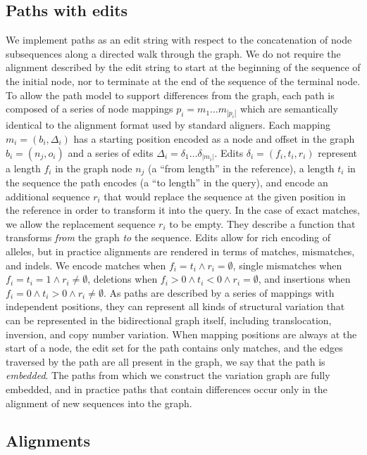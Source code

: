 \subsection{Paths with edits}

We implement paths as an edit string with respect to the concatenation of node subsequences along a directed walk through the graph.
We do not require the alignment described by the edit string to start at the beginning of the sequence of the initial node, nor to terminate at the end of the sequence of the terminal node.
To allow the path model to support differences from the graph, each path is composed of a series of node mappings $p_i = m_1 \ldots m_{|p_i|}$ which are semantically identical to the alignment format used by standard aligners.
Each mapping $m_i = ( b_i, \Delta_i )$ has a starting position encoded as a node and offset in the graph $b_i = ( n_j, o_i )$ and a series of edits $\Delta_i = \delta_1 \ldots \delta_{|m_i|}$.
Edits $\delta_i = ( f_i, t_i, r_i )$ represent a length $f_i$ in the graph node $n_j$ (a ``from length'' in the reference), a length $t_i$ in the sequence the path encodes (a ``to length'' in the query), and encode an additional sequence $r_i$ that would replace the sequence at the given position in the reference in order to transform it into the query.
In the case of exact matches, we allow the replacement sequence $r_i$ to be empty.
They describe a function that transforms \emph{from} the graph \emph{to} the sequence.
Edits allow for rich encoding of alleles, but in practice alignments are rendered in terms of matches, mismatches, and indels.
We encode matches when $f_i = t_i \land r_i = \emptyset$, single mismatches when $f_i = t_i = 1 \land r_i \neq \emptyset$, deletions when $f_i > 0 \land t_i < 0 \land r_i = \emptyset$, and insertions when $f_i = 0 \land t_i > 0 \land r_i \neq \emptyset$.
As paths are described by a series of mappings with independent positions, they can represent all kinds of structural variation that can be represented in the bidirectional graph itself, including translocation, inversion, and copy number variation.
When mapping positions are always at the start of a node, the edit set for the path contains only matches, and the edges traversed by the path are all present in the graph, we say that the path is \emph{embedded}.
The paths from which we construct the variation graph are fully embedded, and in practice paths that contain differences occur only in the alignment of new sequences into the graph.

\subsection{Alignments}
\label{sec:alignments}

